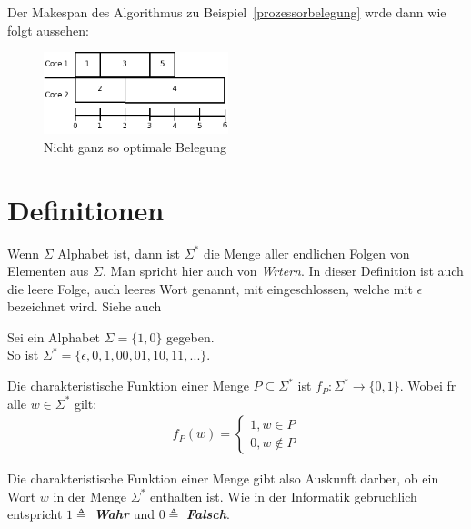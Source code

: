 \documentclass[12pt, a4paper, twoside]{scrartcl}
\begin{document}
Der Makespan des Algorithmus zu Beispiel~\ref{prozessorbelegung} wrde dann wie folgt aussehen:

\begin{figure}[htbp]
	\centering
		\includegraphics[height=90px]{img/nich_so_opt_prozessor_belegung.png}
	\caption{Nicht ganz so optimale Belegung}
	\label{fig:img_nich_so_opt_prozessor_belegung}
\end{figure}


\section{Definitionen} %

Wenn $\Sigma$ Alphabet ist, dann ist $\Sigma^*$ die Menge aller endlichen Folgen von Elementen aus $\Sigma$. Man spricht hier auch von \emph{Wrtern}.\label{Wort} In dieser Definition ist auch die leere Folge, auch leeres Wort genannt, mit eingeschlossen, welche mit $\epsilon$ bezeichnet wird. Siehe auch \cite[S.11]{tikg}

\begin{example}
	Sei ein Alphabet $\Sigma = \{1,0\}$ gegeben. \\
	So ist $\Sigma^* = \{\epsilon,0,1,00,01,10,11,...\}$.\label{Sigma} 
\end{example}



\begin{definition}
	Die charakteristische Funktion einer Menge $P \subseteq \Sigma^*$ ist $f_P:\Sigma^* \rightarrow \{0,1\}$. Wobei fr alle $w \in \Sigma^*$ gilt:\\
	\begin{align}
		f_{P}(w) = 
		\begin{cases}
			1, w \in P\\
			0, w \notin P			
		\end{cases}
	\end{align}
\end{definition}

Die charakteristische Funktion einer Menge gibt also Auskunft darber, ob ein Wort $w$ in der Menge $\Sigma^*$ enthalten ist. Wie in der Informatik gebruchlich entspricht $1 \triangleq$ \emph{\textbf{Wahr}} und $0 \triangleq$ \emph{\textbf{Falsch}}.
\end{document}
